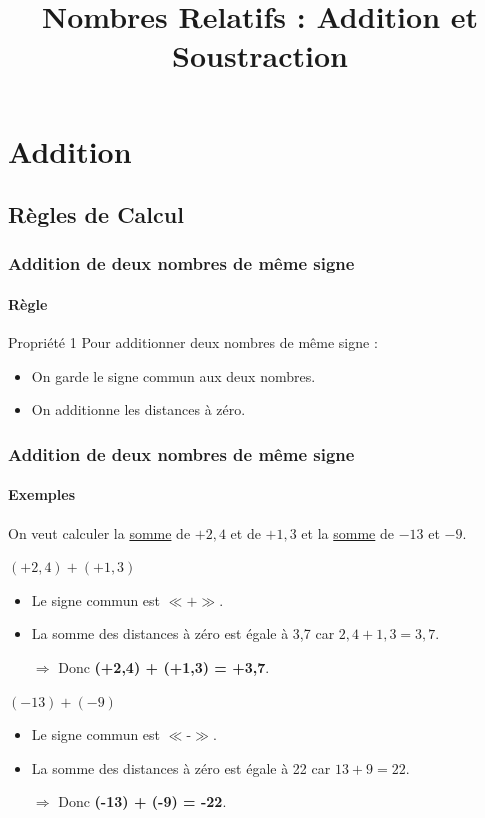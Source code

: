 \documentclass{beamer}
\title{Nombres Relatifs : Addition et Soustraction}
\author{}\institute{}
\begin{document}
	
	
	
\begin{frame}
	\titlepage
\end{frame}

\section{Addition}

\subsection{Règles de Calcul}


\begin{frame}
\frametitle{Addition de deux nombres de même signe}  
\framesubtitle{Règle}	
	
\begin{block}{Propriété 1}
	Pour additionner deux nombres de même signe :
	\begin{itemize}
		\item On garde le signe commun aux deux nombres.
		\item On additionne les distances à zéro.
	\end{itemize}
\end{block}	

\end{frame}

\begin{frame}
	\frametitle{Addition de deux nombres de même signe}  
	\framesubtitle{Exemples}	
	
	On veut calculer la \underline{somme} de $ +2,4 $ et de $ +1,3 $ et la \underline{somme} de $ -13 $ et $ -9 $.\pause
	
	\begin{exampleblock}{$ (+2,4) + (+1,3) $}
		\begin{itemize} %
			\item Le signe commun est $ \ll \textbf{+} \gg $. %
			\item La somme des distances à zéro est égale à 3,7 
			car $ 2,4 + 1,3 = 3,7 $. %
			\item[$\Rightarrow$] Donc \textbf{(+2,4) + (+1,3) = +3,7}.\pause
		\end{itemize}
	\end{exampleblock}
	
	\begin{exampleblock}{$ (-13) + (-9) $}
		\begin{itemize}
			\item Le signe commun est $ \ll \textbf{-} \gg $.
			\item La somme des distances à zéro est égale à 22 
			car $ 13 + 9 = 22 $.
			\item[$\Rightarrow$] Donc \textbf{(-13) + (-9) = -22}.
		\end{itemize}
	\end{exampleblock}
\end{frame}
\end{document}
